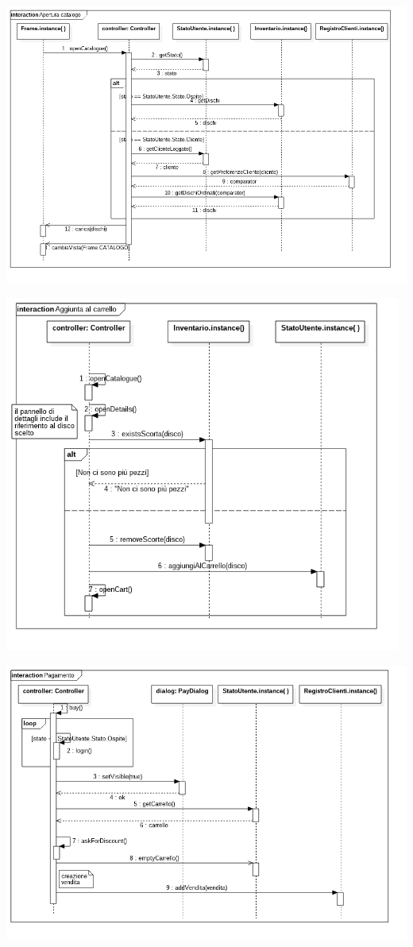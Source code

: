 \begin{center}
    \includegraphics[width=\textwidth]{diagram/seq-apertura-catalogo.png}
\end{center}

\begin{center}
    \includegraphics[width=0.98\textwidth]{diagram/seq-aggiunta-carrello.png}
\end{center}

\begin{center}
    \includegraphics[width=\textwidth]{diagram/seq-pagamento.png}
\end{center}



